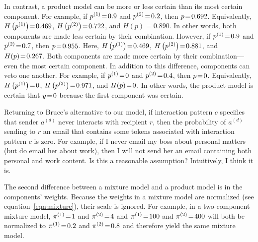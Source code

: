 \documentclass[10pt,english,oneside]{article}
\begin{document}
In contrast, a product model can be more or less certain than its most
certain component. For example, if $p^{(1)} \!=\! 0.9$ and $p^{(2)}
\!=\! 0.2$, then $p \!=\! 0.692$. Equivalently, $H\left( p^{(1)}\right)
\!=\! 0.469$, $H\left( p^{(2)}\right) \!=\! 0.722$, and $H(p) =
0.890$. In other words, both components are made less certain by their
combination. However, if $p^{(1)} \!=\! 0.9$ and $p^{(2)} \!=\! 0.7$,
then $p \!=\! 0.955$. Here, $H\left( p^{(1)} \right) \!=\! 0.469$, $H
\left( p^{(2)}\right) \!=\! 0.881$, and $H(p) \!=\! 0.267$. Both
components are made more certain by their combination---even the most
certain component. In addition to this difference, components can veto
one another. For example, if $p^{(1)} \!=\! 0$ and $p^{(2)} \!=\! 0.4$,
then $p \!=\! 0$. Equivalently, $H\left( p^{(1)} \right) \!=\! 0$, $H
\left( p^{(2)}\right) \!=\! 0.971$, and $H(p) \!=\! 0$. In other words,
the product model is certain that $y \!=\! 0$ because the first
component was certain.

Returning to Bruce's alternative to our model, if interaction pattern
$c$ specifies that sender $a^{(d)}$ never interacts with recipient
$r$, then the probability of $a^{(d)}$ sending to $r$ an email that
contains some tokens associated with interaction pattern $c$ is
zero. For example, if I never email my boss about personal matters
(but do email her about work), then I will not send her an email
containing both personal and work content. Is this a reasonable
assumption?  Intuitively, I think it is.

The second difference between a mixture model and a product model is
in the components' weights. Because the weights in a mixture model are
normalized (see equation~\ref{eqn:mixture}), their scale is
ignored. For example, in a two-component mixture model, $\pi^{(1)}
\!=\! 1$ and $\pi^{(2)} \!=\! 4$ and $\pi^{(1)} \!=\! 100$ and $\pi^{(2)}
\!=\! 400$ will both be normalized to $\pi^{(1)} \!=\! 0.2$ and
$\pi^{(2)} \!=\! 0.8$ and therefore yield the same mixture model.
\end{document}
